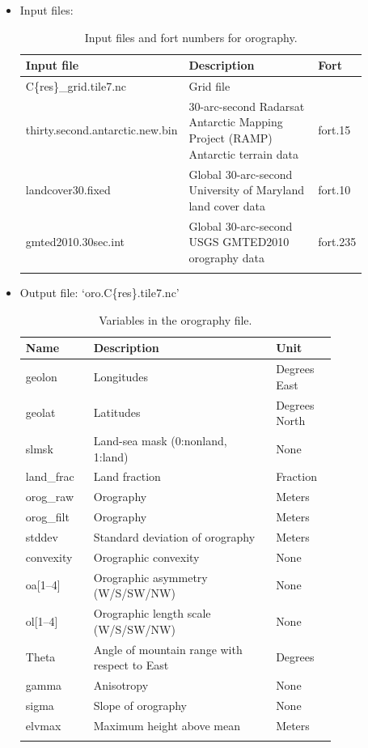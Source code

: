 \documentclass[11pt,fleqn]{report}              %
\begin{document}
\begin{itemize}
\item Input files:
{
\fontsize{10}{12}\selectfont
\begin{longtable}{ p{0.3\linewidth} | p{0.5\linewidth} | p{0.08\linewidth} }
\hline
\hline
Input file & Description & Fort \\
\hline
 C\{res\}\_grid.tile7.nc & Grid file & \\
 thirty.second.antarctic.new.bin & 30-arc-second Radarsat Antarctic Mapping Project (RAMP) Antarctic terrain data & fort.15 \\
 landcover30.fixed & Global 30-arc-second University of Maryland land cover data & fort.10 \\
 gmted2010.30sec.int & Global 30-arc-second USGS GMTED2010 orography data & fort.235 \\
\hline
\caption{Input files and fort numbers for orography.}
\label{table:var_oro_input}
\end{longtable}
}

\item Output file: `oro.C\{res\}.tile7.nc'
{
\fontsize{10}{12}\selectfont
\begin{longtable}{p{0.15\linewidth} | p{0.5\linewidth} | p{0.15\linewidth} }
\hline
\hline
Name & Description & Unit \\
\hline
 geolon & Longitudes & Degrees East \\
 geolat & Latitudes & Degrees North \\
 slmsk & Land-sea mask (0:nonland, 1:land) & None \\
 land\_frac & Land fraction & Fraction \\
 orog\_raw & Orography & Meters \\
 orog\_filt & Orography & Meters \\
 stddev & Standard deviation of orography & Meters \\
 convexity & Orographic convexity & None \\
 oa[1--4] & Orographic asymmetry (W/S/SW/NW) & None \\
 ol[1--4] & Orographic length scale (W/S/SW/NW) & None \\
 Theta & Angle of mountain range with respect to East & Degrees \\
 gamma & Anisotropy & None \\
 sigma & Slope of orography & None \\
 elvmax & Maximum height above mean & Meters \\
\hline
\caption{Variables in the orography file.}
\label{table:var_oro_output}
\end{longtable}
}

\end{itemize}
\end{document}

